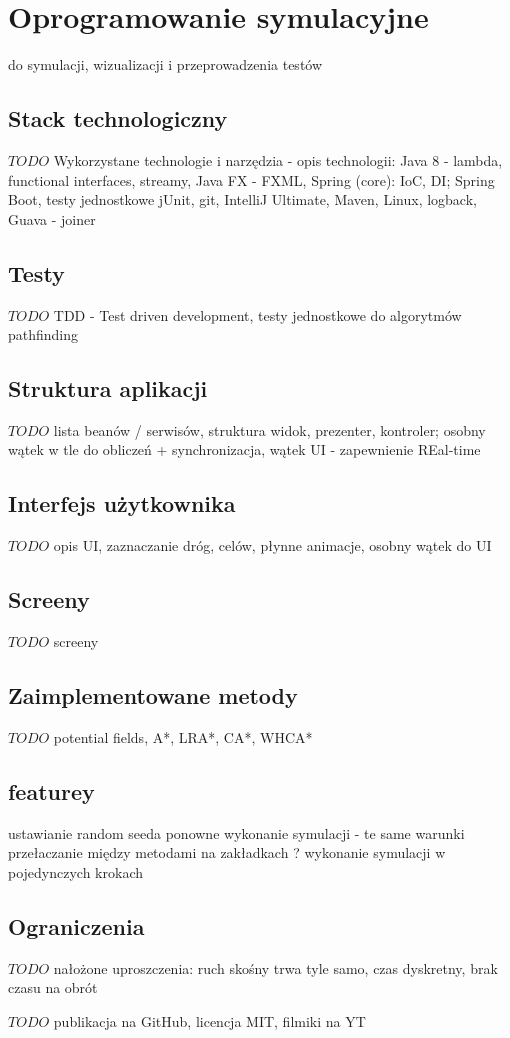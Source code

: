 \chapter{Oprogramowanie symulacyjne}
\label{ch:simulation-app}

do symulacji, wizualizacji i przeprowadzenia testów

\section{Stack technologiczny}
$TODO$ Wykorzystane technologie i narzędzia - opis technologii:
Java 8 - lambda, functional interfaces, streamy,
Java FX - FXML, Spring (core): IoC, DI; Spring Boot, testy jednostkowe jUnit, git, IntelliJ Ultimate, Maven, Linux, logback, Guava - joiner

\section{Testy}
$TODO$ TDD - Test driven development, testy jednostkowe do algorytmów pathfinding

\section{Struktura aplikacji}
$TODO$ lista beanów / serwisów, struktura widok, prezenter, kontroler; osobny wątek w tle do obliczeń + synchronizacja, wątek UI - zapewnienie REal-time

\section{Interfejs użytkownika}
$TODO$ opis UI, zaznaczanie dróg, celów, płynne animacje, osobny wątek do UI

\section{Screeny}
$TODO$ screeny

\section{Zaimplementowane metody}
$TODO$ potential fields, A*, LRA*, CA*, WHCA*

\section{featurey}
ustawianie random seeda
ponowne wykonanie symulacji - te same warunki
przełaczanie między metodami na zakładkach ?
wykonanie symulacji w pojedynczych krokach


\section{Ograniczenia}
$TODO$ nałożone uproszczenia: ruch skośny trwa tyle samo, czas dyskretny, brak czasu na obrót

$TODO$ publikacja na GitHub, licencja MIT, filmiki na YT